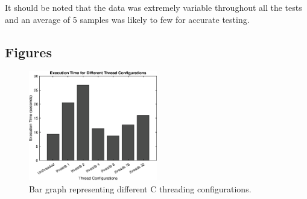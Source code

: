 It should be noted that the data was extremely variable throughout all the tests and an average of 5 samples was likely to few for accurate testing.

\subsection{Figures}

\begin{figure}[htd]
 \centering
 \includegraphics[width=0.5\textwidth]{bargraf_on_C_Threaded}
 \caption{Bar graph representing different C threading configurations.}
 \label{fig:threading}
\end{figure}


